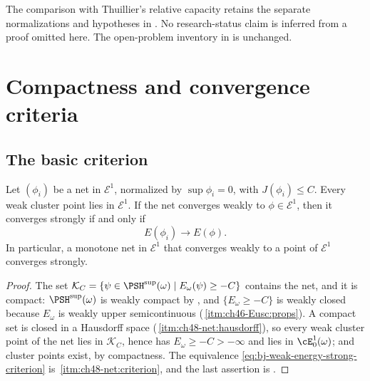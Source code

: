 The comparison with Thuillier's relative capacity retains the separate
normalizations and hypotheses in .
No research-status claim is inferred from a proof omitted here.
The open-problem inventory in  is unchanged.

\section{Compactness and convergence criteria}
\label{sec:ch48-compactness}

\subsection{The basic criterion}
\label{sec:ch48-basic-criterion}

\begin{proposition}\label{prop:bj-strong-compactness-criterion}
Let $(\phi_i)$ be a net in $\mathcal E^1$, normalized by
$\sup\phi_i=0$, with $J(\phi_i)\leq C$.  Every weak cluster point lies
in $\mathcal E^1$.  If the net converges weakly to
$\phi\in\mathcal E^1$, then it converges strongly if and only if
\[
                         E(\phi_i)\longrightarrow E(\phi).
\tag{48.15}\label{eq:bj-weak-energy-strong-criterion}
\]
In particular, a monotone net in $\mathcal E^1$ that converges weakly to
a point of $\mathcal E^1$ converges strongly.
\end{proposition}

\begin{proof}
The set
$\mathcal K_C=\{\psi\in\PSH^{\sup}(\omega)\mid E_\omega(\psi)\ge-C\}$
contains the net, and it is compact: $\PSH^{\sup}(\omega)$ is weakly
compact by , and $\{E_\omega\ge-C\}$ is weakly
closed because $E_\omega$ is weakly upper semicontinuous
(\,\cref{itm:ch46-Eusc:props}).  A compact set is
closed in a Hausdorff space
(\,\cref{itm:ch48-net:hausdorff}), so every
weak cluster point of the net lies in $\mathcal K_C$, hence has
$E_\omega\ge-C>-\infty$ and lies in $\cE^1_0(\omega)$; and cluster
points exist, by compactness.  The equivalence
\eqref{eq:bj-weak-energy-strong-criterion} is
\,\cref{itm:ch48-net:criterion}, and the last
assertion is .
\end{proof}

